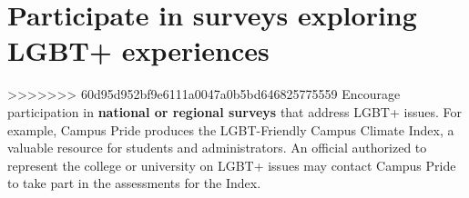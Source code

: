 \section [Participate in surveys exploring LGBT+ experiences]{Participate in surveys exploring LGBT+ experiences}
>>>>>>> 60d95d952bf9e6111a0047a0b5bd646825775559
\label{univ-surveys}
Encourage participation in \textbf{national or regional surveys} that address LGBT+ issues. For example, Campus Pride produces the LGBT-Friendly Campus Climate Index, a valuable resource for students and administrators. An official authorized to represent the college or university on LGBT+ issues may contact Campus Pride to take part in the assessments for the Index.


















